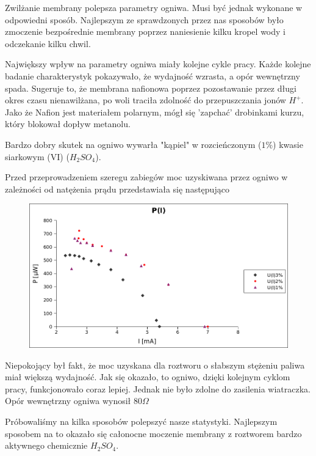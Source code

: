 \documentclass[a4paper,12pt]{article}
\begin{document}
Zwilżanie membrany polepsza parametry ogniwa. Musi być jednak wykonane w odpowiedni sposób. Najlepszym ze sprawdzonych przez nas sposobów było zmoczenie bezpośrednie membrany poprzez naniesienie kilku kropel wody i odczekanie kilku chwil.

Największy wpływ na parametry ogniwa miały kolejne cykle pracy. Każde kolejne badanie charakterystyk pokazywało, że wydajność wzrasta, a opór wewnętrzny spada. Sugeruje to, że membrana nafionowa poprzez pozostawanie przez długi okres czasu nienawilżana, po woli traciła zdolność do przepuszczania jonów $H^+$. Jako że Nafion jest materiałem polarnym, mógł się 'zapchać' drobinkami kurzu, który blokował dopływ metanolu.

Bardzo dobry skutek na ogniwo wywarła "kąpiel" w rozcieńczonym ($1\%$) kwasie siarkowym (VI) ($ H_2SO_4 $).

Przed przeprowadzeniem szeregu zabiegów moc uzyskiwana przez ogniwo w zależności od natężenia prądu przedstawiała się następująco

\begin{figure} [H]
 \begin{center}
    \includegraphics[width = 15cm]{przed.png}
  \end{center}
\end{figure}
Niepokojący był fakt, że moc uzyskana dla roztworu o słabszym stężeniu paliwa miał większą wydajność. Jak się okazało, to ogniwo, dzięki kolejnym cyklom pracy, funkcjonowało coraz lepiej. Jednak nie było zdolne do zasilenia wiatraczka. Opór wewnętrzny ogniwa wynosił $80 \Omega $


Próbowaliśmy na kilka sposobów polepszyć nasze statystyki. Najlepszym sposobem na to okazało się całonocne moczenie membrany z roztworem bardzo aktywnego chemicznie $ H_2SO_4 $. 
\end{document}
